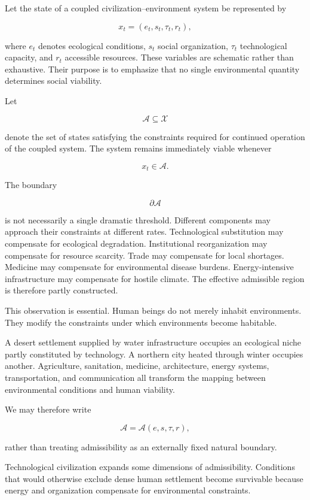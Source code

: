 \documentclass[11pt,oneside]{book}
\theoremstyle{definition}
\theoremstyle{remark}
\newcommand{\A}{\mathcal{A}}
\begin{document}
Let the state of a coupled civilization--environment system be represented by

\[
x_t
=
(e_t,s_t,\tau_t,r_t),
\]

where \(e_t\) denotes ecological conditions, \(s_t\) social organization, \(\tau_t\) technological capacity, and \(r_t\) accessible resources. These variables are schematic rather than exhaustive. Their purpose is to emphasize that no single environmental quantity determines social viability.

Let

\[
\A
\subseteq
\mathcal X
\]

denote the set of states satisfying the constraints required for continued operation of the coupled system. The system remains immediately viable whenever

\[
x_t\in\A.
\]

The boundary

\[
\partial\A
\]

is not necessarily a single dramatic threshold. Different components may approach their constraints at different rates. Technological substitution may compensate for ecological degradation. Institutional reorganization may compensate for resource scarcity. Trade may compensate for local shortages. Medicine may compensate for environmental disease burdens. Energy-intensive infrastructure may compensate for hostile climate. The effective admissible region is therefore partly constructed.

This observation is essential. Human beings do not merely inhabit environments. They modify the constraints under which environments become habitable.

A desert settlement supplied by water infrastructure occupies an ecological niche partly constituted by technology. A northern city heated through winter occupies another. Agriculture, sanitation, medicine, architecture, energy systems, transportation, and communication all transform the mapping between environmental conditions and human viability.

We may therefore write

\[
\A
=
\A(e,s,\tau,r),
\]

rather than treating admissibility as an externally fixed natural boundary.

Technological civilization expands some dimensions of admissibility. Conditions that would otherwise exclude dense human settlement become survivable because energy and organization compensate for environmental constraints.
\end{document}

